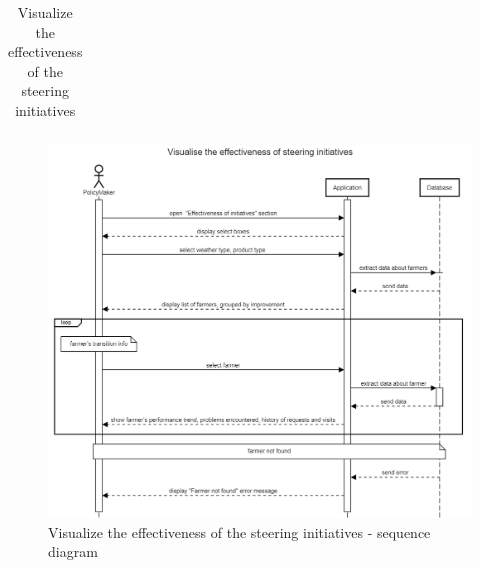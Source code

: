 \begin{table}[H]
\begin{tabular}{|l|p{}|}
    \end{tabular}
    \caption{\label{tab:visualize_iprovement}Visualize the effectiveness of the steering initiatives}
\end{table}

\begin{figure}[H]
    \centering
    \includegraphics[scale=0.5]{Images/Sequence diagrams/SE2 - visualise effectiveness of steering initiatives (pm).png}
    \caption{Visualize the effectiveness of the steering initiatives - sequence diagram}
    \label{fig:my_label}
\end{figure}

